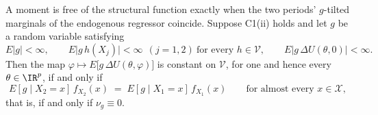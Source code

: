 \begin{proposition}\label{prp:nophifree}
A moment is free of the structural function exactly when the two periods' $g$-tilted marginals of the
endogenous regressor coincide.
Suppose C1(ii) holds and let $g$ be a random variable satisfying
\begin{equation}\label{eq:gproviso}
E|g|<\infty,
\qquad
E\big|g\,h(X_j)\big|<\infty\ \ (j=1,2)\ \text{for every }h\in\mathcal V,
\qquad
E\big|g\,\Delta U(\theta,0)\big|<\infty .
\end{equation}
Then the map $\varphi\mapsto E\big[g\,\Delta U(\theta,\varphi)\big]$ is constant on $\mathcal V$, for one
and hence every $\theta\in\IR^{p}$, if and only if
\begin{equation}\label{eq:tilted}
E[g\mid X_2=x]\,f_{X_2}(x)\;=\;E[g\mid X_1=x]\,f_{X_1}(x)
\qquad\text{for almost every }x\in\mathcal X,
\end{equation}
that is, if and only if $\nu_g\equiv0$.
\end{proposition}

